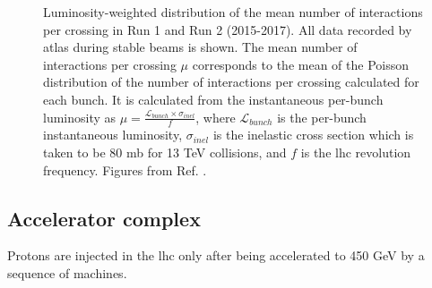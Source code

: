 \begin{figure}[ht]
\centering
{}
\caption{Luminosity-weighted distribution of the mean number of interactions per crossing in 
 Run 1 and  Run 2 (2015-2017). All data recorded by \gls{atlas} during stable beams is shown. The mean number of interactions per crossing $\mu$ corresponds to the mean of the Poisson distribution of the number of interactions per crossing calculated for each bunch. It is calculated from the instantaneous per-bunch luminosity as 
$\mu = \frac{\mathcal{L}_{bunch}\times \sigma_{inel}}{f}$, where $\mathcal{L}_{bunch}$ is the per-bunch instantaneous luminosity, $\sigma_{inel}$ is the inelastic cross section which is taken to be 80 mb for 13 TeV collisions, and $f$ is the \gls{lhc} revolution frequency. Figures from Ref. \cite{LumiTwiki}.}
\label{fig:atlas:pu}
\end{figure}


\subsection{Accelerator complex}

Protons are injected in the \gls{lhc} only after being accelerated to 450 GeV by a sequence of machines.

